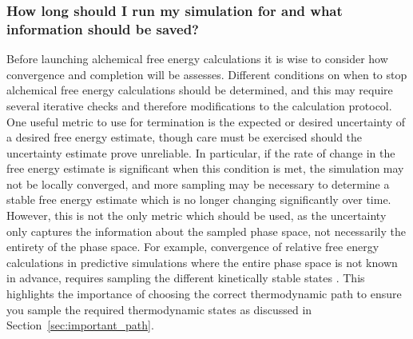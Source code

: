 \documentclass[9pt,bestpractices]{livecoms}
\begin{document}
\subsubsection*{How long should I run my simulation for and what information should be saved?}



% 

Before launching alchemical free energy calculations it is wise to consider how convergence and completion will be assesses. Different conditions on when to stop alchemical free energy calculations should be determined, and this may require several iterative checks and therefore modifications to the calculation protocol.
One useful metric to use for termination is the expected or desired uncertainty of a desired free energy estimate, though care must be exercised should the uncertainty estimate prove unreliable.
In particular, if the rate of change in the free energy estimate is significant when this condition is met, the simulation may not be locally converged, and more sampling may be necessary to determine a stable free energy estimate which is no longer changing significantly over time. 
However, this is not the only metric which should be used, as the uncertainty only captures the information about the sampled phase space, not necessarily the entirety of the phase space.  
For example, 
convergence of relative free energy calculations in predictive simulations where the entire phase space is not known in advance, requires sampling the different kinetically stable states . 
This highlights the importance of choosing the correct thermodynamic path to ensure you sample the required thermodynamic states as discussed in Section~\ref{sec:important_path}.
\end{document}
